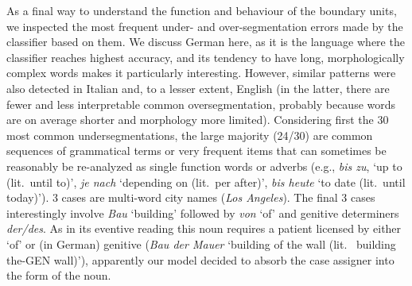 
As a final way to understand the function and behaviour of the
boundary units, we inspected the most frequent under- and
over-segmentation errors made by the classifier based on them. We
discuss German here, as it is the language where the classifier
reaches highest accuracy, and its tendency to have long,
morphologically complex words makes it particularly
interesting. However, similar patterns were also detected in Italian
and, to a lesser extent, English (in the latter, there are fewer and
less interpretable common oversegmentation, probably because words are
on average shorter and morphology more limited). Considering first the
30 most common undersegmentations, the
large majority (24/30) are common sequences of grammatical terms or
very frequent items that can sometimes be reasonably be re-analyzed as
single function words or adverbs (e.g., \emph{bis zu}, `up to
(lit.~until to)', \emph{je nach} `depending on (lit.~per after)',
\emph{bis heute} `to date (lit.~until today)'). 3 cases are multi-word
city names (\emph{Los Angeles}). The final 3 cases interestingly
involve \emph{Bau} `building' followed by \emph{von} `of' and genitive
determiners \emph{der/des}. As in its eventive reading this noun
requires a patient licensed by either `of' or (in German) genitive
(\emph{Bau der Mauer} `building of the wall (lit.~ building the-GEN
wall)'), apparently our model decided to absorb the case assigner into
the form of the noun.

